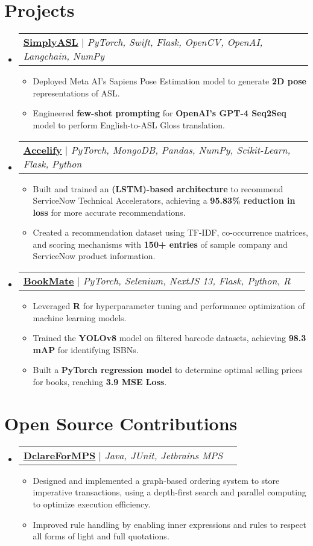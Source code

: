 \documentclass[letterpaper,11pt]{article}
\makeatletter
\newcommand{\resumeItem}[1]{
  \item\small{
    {#1 \vspace{-2pt}}
  }
}
\newcommand{\resumeProjectHeading}[2]{
    \item
    \begin{tabular*}{0.97\textwidth}{l@{\extracolsep{\fill}}r}
      \small#1 & #2 \\
    \end{tabular*}\vspace{-7pt}
}
\newcommand{\resumeSubHeadingListStart}{\begin{itemize}[leftmargin=0.15in, label={}]}
\newcommand{\resumeSubHeadingListEnd}{\end{itemize}}
\newcommand{\resumeItemListStart}{\begin{itemize}}
\newcommand{\resumeItemListEnd}{\end{itemize}\vspace{-5pt}}
\makeatother
\begin{document}
\section{Projects}
  \resumeSubHeadingListStart
    \resumeProjectHeading
      {\faGithub\hspace{0.25pt} \href{https://github.com/DRobinson4105/Simply-ASL}{\textbf{\uline{SimplyASL}}} $|$ \emph{PyTorch, Swift, Flask, OpenCV, OpenAI, Langchain, NumPy}}{}
      \resumeItemListStart
        \resumeItem{Deployed Meta AI’s Sapiens Pose Estimation model to generate \textbf{2D pose} representations of ASL.}
        \resumeItem{Engineered \textbf{few-shot prompting} for \textbf{OpenAI's GPT-4 Seq2Seq} model to perform English-to-ASL Gloss translation.}
      \resumeItemListEnd
    \resumeProjectHeading
      {\faGithub\hspace{0.25pt} \href{https://github.com/DRobinson4105/accelify}{\textbf{\uline{Accelify}}} $|$ \emph{PyTorch, MongoDB, Pandas, NumPy, Scikit-Learn, Flask, Python}}{}
      \resumeItemListStart
        \resumeItem{Built and trained an \textbf{(LSTM)-based architecture} to recommend ServiceNow Technical Accelerators, achieving a \textbf{95.83\% reduction in loss} for more accurate recommendations.}
        \resumeItem{Created a recommendation dataset using TF-IDF, co-occurrence matrices, and scoring mechanisms with \textbf{150+ entries} of sample company and ServiceNow product information.}
      \resumeItemListEnd
    \resumeProjectHeading
      {\faGithub\hspace{0.25pt} \href{https://github.com/DRobinson4105/bookmate}{\textbf{\uline{BookMate}}} $|$ \emph{PyTorch, Selenium, NextJS 13, Flask, Python, R}}{}
      \resumeItemListStart
        \resumeItem{Leveraged \textbf{R} for hyperparameter tuning and performance optimization of machine learning models.}
        \resumeItem{Trained the \textbf{YOLOv8} model on filtered barcode datasets, achieving \textbf{98.3 mAP} for identifying ISBNs.}
        \resumeItem{Built a \textbf{PyTorch regression model} to determine optimal selling prices for books, reaching \textbf{3.9 MSE Loss}.}
      \resumeItemListEnd
  \resumeSubHeadingListEnd

\section{Open Source Contributions}
  \resumeSubHeadingListStart
    \resumeProjectHeading
      {\faGithub\hspace{0.25pt} \href{https://github.com/ModelingValueGroup/dclareForMPS}{\textbf{\uline{DclareForMPS}}} $|$ \emph{Java, JUnit, Jetbrains MPS}}{}
      \resumeItemListStart
        \resumeItem{Designed and implemented a graph-based ordering system to store imperative transactions, using a depth-first search and parallel computing to optimize execution efficiency.}
        \resumeItem{Improved rule handling by enabling inner expressions and rules to respect all forms of light and full quotations.}
      \resumeItemListEnd
  \resumeSubHeadingListEnd
\end{document}
